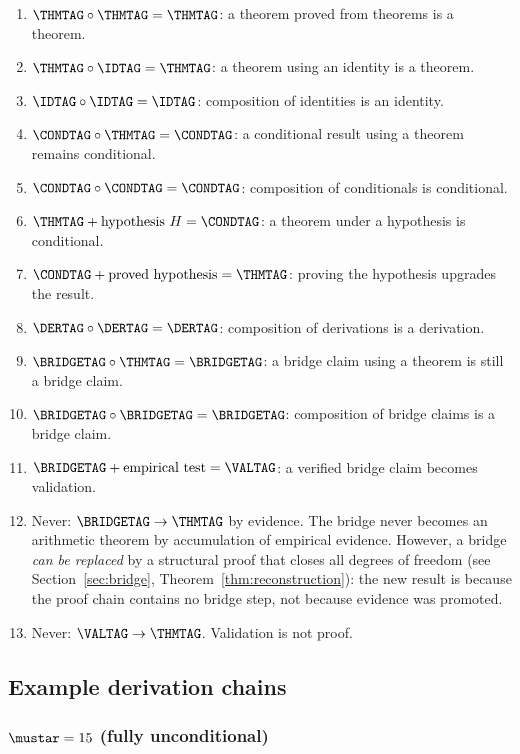 \documentclass[12pt,a4paper]{article}
\begin{document}
\begin{enumerate}[leftmargin=*, label=\textbf{R\arabic*.}]
\item $\THMTAG \circ \THMTAG = \THMTAG$:
  a theorem proved from theorems is a theorem.
\item $\THMTAG \circ \IDTAG = \THMTAG$:
  a theorem using an identity is a theorem.
\item $\IDTAG \circ \IDTAG = \IDTAG$:
  composition of identities is an identity.
\item $\CONDTAG \circ \THMTAG = \CONDTAG$:
  a conditional result using a theorem remains conditional.
\item $\CONDTAG \circ \CONDTAG = \CONDTAG$:
  composition of conditionals is conditional.
\item $\THMTAG + \text{hypothesis } H = \CONDTAG$:
  a theorem under a hypothesis is conditional.
\item $\CONDTAG + \text{proved hypothesis} = \THMTAG$:
  proving the hypothesis upgrades the result.
\item $\DERTAG \circ \DERTAG = \DERTAG$:
  composition of derivations is a derivation.
\item $\BRIDGETAG \circ \THMTAG = \BRIDGETAG$:
  a bridge claim using a theorem is still a bridge claim.
\item $\BRIDGETAG \circ \BRIDGETAG = \BRIDGETAG$:
  composition of bridge claims is a bridge claim.
\item $\BRIDGETAG + \text{empirical test} = \VALTAG$:
  a verified bridge claim becomes validation.
\item Never: $\BRIDGETAG \to \THMTAG$ by evidence.
  The bridge never becomes an arithmetic theorem by
  accumulation of empirical evidence.
  However, a bridge \emph{can be replaced} by a structural
  proof that closes all degrees of freedom (see Section~\ref{sec:bridge},
  Theorem~\ref{thm:reconstruction}): the new result is
  \THMTAG{} because the proof chain contains no bridge step,
  not because evidence was promoted.
\item Never: $\VALTAG \to \THMTAG$.
  Validation is not proof.
\end{enumerate}

\subsection{Example derivation chains}
\label{sec:app_d_examples}

\subsubsection{$\mustar = 15$ (fully unconditional)}
\end{document}
